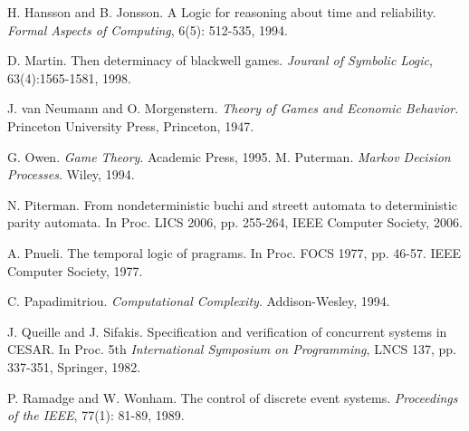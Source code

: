\documentclass[times, 10 pt,twocolumn]{article}
\begin{document}
\begin{thebibliography}{00}
%
%
%
 H. Hansson and B. Jonsson. A Logic for reasoning
about time and reliability. \emph{Formal Aspects of Computing},
6(5): 512-535, 1994.
%
%

%

 D. Martin. Then determinacy of blackwell games.
{\em Jouranl of  Symbolic Logic}, 63(4):1565-1581, 1998.



%
%

 J. van Neumann and O. Morgenstern. {\em Theory of
Games and Economic Behavior}. Princeton University Press,
Princeton, 1947.


 G. Owen. \emph{Game Theory}. Academic Press, 1995.
%
 M. Puterman. \emph{Markov Decision Processes}.
Wiley, 1994.
%
%


N. Piterman. From nondeterministic buchi and streett automata to
deterministic parity automata. In Proc. LICS 2006, pp. 255-264,
IEEE Computer Society, 2006.

 A. Pnueli. The temporal logic of pragrams. In
Proc. FOCS 1977, pp. 46-57. IEEE Computer Society, 1977.


 C. Papadimitriou. \emph{Computational Complexity}.
Addison-Wesley, 1994.

 J. Queille and J. Sifakis. Specification and
verification of concurrent systems in CESAR. In Proc. 5th {\em
International Symposium on Programming}, LNCS 137, pp. 337-351,
Springer, 1982.

 P. Ramadge and W. Wonham. The control of discrete
event systems. {\em Proceedings of the IEEE}, 77(1): 81-89, 1989.


\end{thebibliography}
\end{document}
